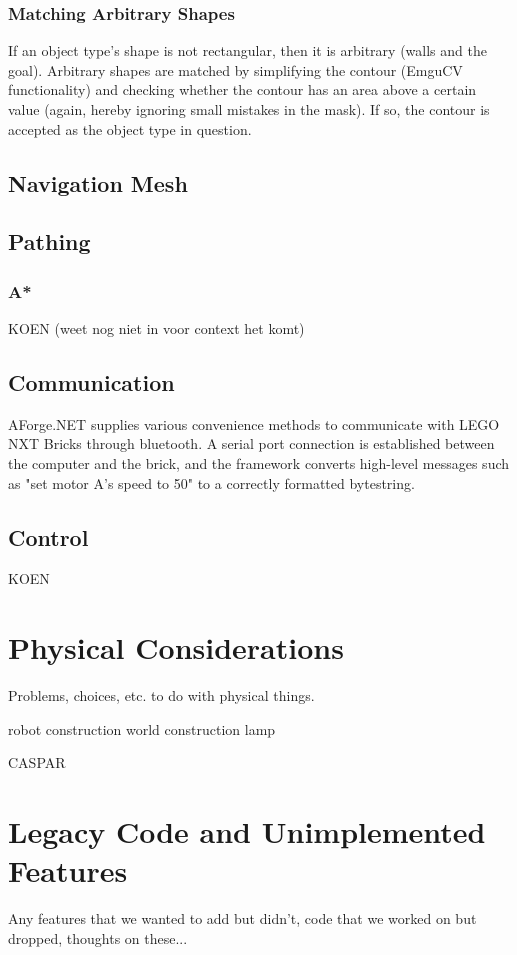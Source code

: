 \documentclass[10pt,twocolumn]{article}
\begin{document}
\subsubsection{Matching Arbitrary Shapes}
If an object type's shape is not rectangular, then it is arbitrary (walls and the goal). Arbitrary shapes are matched by simplifying the contour (EmguCV functionality) and checking whether the contour has an area above a certain value (again, hereby ignoring small mistakes in the mask). If so, the contour is accepted as the object type in question.

\subsection{Navigation Mesh}

\subsection{Pathing}

\subsubsection{A*}
KOEN (weet nog niet in voor context het komt)

\subsection{Communication}
AForge.NET supplies various convenience methods to communicate with LEGO NXT Bricks through bluetooth. A serial port connection is established between the computer and the brick, and the framework converts high-level messages such as "set motor A's speed to 50" to a correctly formatted bytestring.

\subsection{Control}
KOEN

\section{Physical Considerations}
Problems, choices, etc. to do with physical things.

robot construction
world construction
lamp

CASPAR

\section{Legacy Code and Unimplemented Features}
Any features that we wanted to add but didn't, code that we worked on but dropped, thoughts on these...
\end{document}
